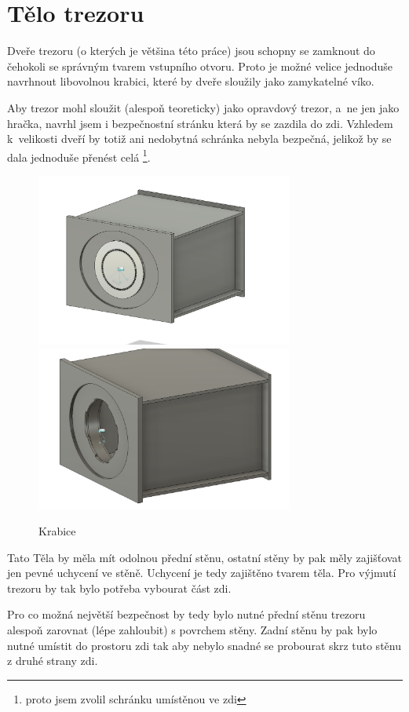 \section{Tělo trezoru}
Dveře trezoru (o kterých je většina této práce) jsou schopny se zamknout do čehokoli se správným tvarem vstupního otvoru. 
Proto je možné velice jednoduše navrhnout libovolnou krabici, které by dveře sloužily jako zamykatelné víko. 

Aby trezor mohl sloužit (alespoň teoreticky) jako opravdový trezor, a~ne jen jako hračka, navrhl jsem i bezpečnostní stránku která by se zazdila do zdi. 
Vzhledem k~velikosti dveří by totiž ani nedobytná schránka nebyla bezpečná, jelikož by se dala jednoduše přenést celá \footnote{proto jsem zvolil schránku umístěnou ve zdi}. 

\begin{figure}[htbp]
    \centering
    \includegraphics[width=240pt]{kapitoly/obrazky/E4/bedna/bedna.png}
    \includegraphics[width=240pt]{kapitoly/obrazky/E4/bedna/jen-bedna.png}
    \caption{Krabice}
    \label{fig:E4-bedna}
\end{figure}

Tato Těla by měla mít odolnou přední stěnu, ostatní stěny by pak měly zajišťovat jen pevné uchycení ve stěně.
Uchycení je tedy zajištěno tvarem těla. Pro výjmutí trezoru by tak bylo potřeba vybourat část zdi.

Pro co možná největší bezpečnost by tedy bylo nutné přední stěnu trezoru alespoň zarovnat (lépe zahloubit) s povrchem stěny.
Zadní stěnu by pak bylo nutné umístit do prostoru zdi tak aby nebylo snadné se probourat skrz tuto stěnu z druhé strany zdi.  %